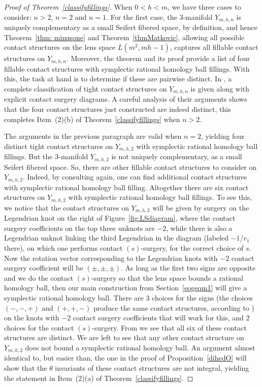 \documentclass[11pt]{amsart}
\theoremstyle{plain}
\theoremstyle{definition}
\theoremstyle{remark}
\numberwithin{theorem}{section}
\begin{document}
\begin{proof}[Proof of Theorem~\ref{classifyfillings}]
When $0<h<m$, we have three cases to consider: $n>2$, $n=2$ and $n=1$. For the first case, the $3$-manifold $Y_{m,h,n}$ is uniquely complementary as a small Seifert fibered space, by definition, and hence Theorem~\ref{thm: minusone} and Theorem~\ref{thmMatkovic}, allowing all possible contact structures on the lens space $L(m^2, mh-1)$, captures all fillable contact structures on $Y_{m,h,n}$. Moreover, the theorem and its proof provide a list of  four fillable contact structures with symplectic rational homology ball fillings. With this, the task at hand is to determine if these are pairwise distinct. In \cite[Theorem~$1.1$]{GhigginiLiscaStipsicz07}, a complete classification of tight contact structures on $Y_{m,h,n}$  is given along with explicit contact surgery diagrams.  A careful analysis of their arguments shows that the four contact structures just constructed are indeed distinct, this completes Item~(2)(b) of Theorem~\ref{classifyfillings} when $n>2$.  

The arguments in the previous paragraph are valid when $n=2$, yielding four distinct tight contact structures on $Y_{m,h,2}$ with symplectic rational homology ball fillings. But the $3$-manifold  $Y_{m,h,2}$ is not uniquely complementary, as a small Seifert fibered space. So, there are other fillable contact structures to consider on $Y_{m,h,2}$.  Indeed, by consulting \cite[Theorem~1.1]{GhigginiLiscaStipsicz07} again, one can find additional contact structures with symplectic rational homology ball filling. Altogether there are six contact structures on $Y_{m,h,2}$  with symplectic rational homology ball fillings. To see this, we notice that the contact structures on $Y_{m,h,2}$ will be given by surgery on the Legendrian knot on the right of Figure~\ref{fig:LSdiagram}, where the contact surgery coefficients on the top three unknots are $-2$, while there is also a Legendrian unknot linking the third Legendrian in the diagram (labeled $-1/r_1$ there), on which one performs contact $(s)$-surgery, for the correct choice of $s$. Now the rotation vector corresponding to the Legendrian knots with $-2$ contact surgery coefficient will be $(\pm, \pm,\pm)$. As long as the first two signs are opposite and we do the contact $(s)$-surgery so that the lens space bounds a rational homology ball, then our main construction from Section~\ref{eogeqm1} will give a symplectic rational homology ball. There are $3$ choices for the signs (the choices $(-, -, +)$ and $(+, +, -)$ produce the same contact structures, according to \cite{GhigginiLiscaStipsicz07} ) on the knots with $-2$ contact surgery coefficients that will work for this, and $2$ choices for the contact $(s)$-surgery. From \cite[Section~4]{GhigginiLiscaStipsicz07} we see that all six of these contact structures are distinct. We are left to see that any other contact structure on $Y_{m,h,2}$ does not bound a symplectic rational homology ball. An argument almost identical to, but easier than, the one in the proof of Proposition~\ref{dihedO} will show that the $\theta$ invariants of these contact structures are not integral, yielding the statement in Item~(2)(a) of Theorem~\ref{classifyfillings}.  


\end{proof}
\end{document}
